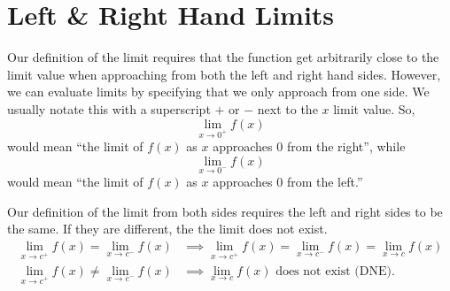 \section{Left \& Right Hand Limits}
Our definition of the limit requires that the function get arbitrarily close to the limit value when approaching from both the left and right hand sides.
However, we can evaluate limits by specifying that we only approach from one side.
We usually notate this with a superscript $+$ or $-$ next to the $x$ limit value.
So,
\begin{equation*}
	\lim_{x \to 0^+}{f(x)}
\end{equation*}
would mean ``the limit of $f(x)$ as $x$ approaches $0$ from the right'', while
\begin{equation*}
	\lim_{x \to 0^-}{f(x)}
\end{equation*}
would mean ``the limit of $f(x)$ as $x$ approaches $0$ from the left.''

Our definition of the limit from both sides requires the left and right sides to be the same.
If they are different, the the limit does not exist.
\begin{align*}
	\lim_{x \to c^+}{f(x)} = \lim_{x \to c^-}{f(x)} &\implies \lim_{x \to c^+}{f(x)} = \lim_{x \to c^-}{f(x)} = \lim_{x \to c}{f(x)} \\
	\lim_{x \to c^+}{f(x)} \neq \lim_{x \to c^-}{f(x)} &\implies \lim_{x \to c}{f(x)} \text{ does not exist (DNE)}.
\end{align*}